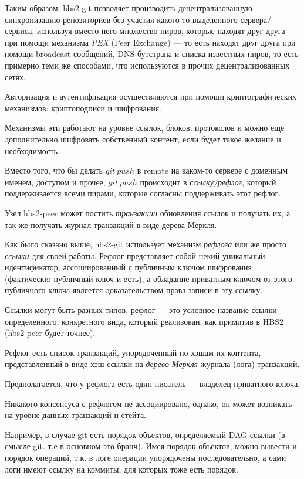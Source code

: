 \documentclass[11pt,a4paper]{article}
\newcommand{\term}[2]{\textit{#2}}
\begin{document}
Таким образом, hbs2-git позволяет производить децентрализованную синхронизацию репозиториев без
участия какого-то выделенного сервера/сервиса, используя вместо него множество пиров, которые
находят друг-друга при помощи механизма \term{pex}{PEX} (Peer Exchange) --- то есть находят друг
друга при помощи broadcast сообщений, DNS бутстрапа и списка известных пиров, то есть примерно  теми
же способами, что используются в прочих децентрализованных сетях.

Авторизация и аутентификация осуществляются при помощи криптографических механизмов: криптоподписи
и шифрования.

Механизмы эти работают на уровне ссылок, блоков, протоколов и можно еще дополнительно шифровать
собственный контент, если будет такое желание и необходимость.

Вместо того, что бы делать $git~push$ в remote на каком-то сервере с доменным именем, доступом и
прочее, $git~push$ происходит в \term{reflog}{ссылку/рефлог}, который поддерживается всеми пирами,
которые согласны поддерживать этот рефлог.

Узел hbs2-peer может постить \term{transaction}{транзакции} обновления ссылок и получать их, а так же
получать журнал транзакций в виде дерева Меркля.

Как было сказано выше, hbs2-git использует механизм \term{reflog}{рефлога} или же просто
\term{reflog}{ссылки} для своей работы. Рефлог представляет собой некий уникальный идентификатор,
ассоциированный с публичным ключом шифрования (фактически: публичный ключ и есть), а обладание
приватным ключом от этого публичного ключа является доказательством права записи в эту ссылку.

Ссылки могут быть разных типов, рефлог --- это условное название ссылки определенного, конкретного
вида, который реализован, как примитив в HBS2 (hbs2-peer будет точнее).

Рефлог есть список транзакций, упорядоченный по хэшам их контента, представленный в виде хэш-ссылки
на \term{ann-merkle-tree}{дерево Меркля} журнала (лога) транзакций.

Предполагается, что у рефлога есть один писатель --- владелец приватного ключа.

Никакого консенсуса с рефлогом не ассоциировано, однако, он может возникать на уровне данных
транзакций и стейта.

Например, в случае git есть порядок объектов, определяемый DAG ссылки (в смысле git. т.е в основном
это бранч). Имея порядок объектов, можно вывести и порядок операций, т.к. в логе операции
упорядочены последовательно, а сами логи имеют ссылку на коммиты, для которых тоже есть порядок.
\end{document}
